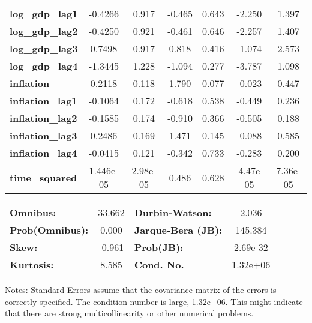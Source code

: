 \begin{center}
\begin{tabular}{lcccccc}
\textbf{log\_gdp\_lag1}  &      -0.4266  &        0.917     &    -0.465  &         0.643        &       -2.250    &        1.397     \\
\textbf{log\_gdp\_lag2}  &      -0.4250  &        0.921     &    -0.461  &         0.646        &       -2.257    &        1.407     \\
\textbf{log\_gdp\_lag3}  &       0.7498  &        0.917     &     0.818  &         0.416        &       -1.074    &        2.573     \\
\textbf{log\_gdp\_lag4}  &      -1.3445  &        1.228     &    -1.094  &         0.277        &       -3.787    &        1.098     \\
\textbf{inflation}       &       0.2118  &        0.118     &     1.790  &         0.077        &       -0.023    &        0.447     \\
\textbf{inflation\_lag1} &      -0.1064  &        0.172     &    -0.618  &         0.538        &       -0.449    &        0.236     \\
\textbf{inflation\_lag2} &      -0.1585  &        0.174     &    -0.910  &         0.366        &       -0.505    &        0.188     \\
\textbf{inflation\_lag3} &       0.2486  &        0.169     &     1.471  &         0.145        &       -0.088    &        0.585     \\
\textbf{inflation\_lag4} &      -0.0415  &        0.121     &    -0.342  &         0.733        &       -0.283    &        0.200     \\
\textbf{time\_squared}   &    1.446e-05  &     2.98e-05     &     0.486  &         0.628        &    -4.47e-05    &     7.36e-05     \\
\bottomrule
\end{tabular}
\begin{tabular}{lclc}
\textbf{Omnibus:}       & 33.662 & \textbf{  Durbin-Watson:     } &    2.036  \\
\textbf{Prob(Omnibus):} &  0.000 & \textbf{  Jarque-Bera (JB):  } &  145.384  \\
\textbf{Skew:}          & -0.961 & \textbf{  Prob(JB):          } & 2.69e-32  \\
\textbf{Kurtosis:}      &  8.585 & \textbf{  Cond. No.          } & 1.32e+06  \\
\bottomrule
\end{tabular}
\end{center}

Notes: \newline
 [1] Standard Errors assume that the covariance matrix of the errors is correctly specified. \newline
 [2] The condition number is large, 1.32e+06. This might indicate that there are \newline
 strong multicollinearity or other numerical problems.